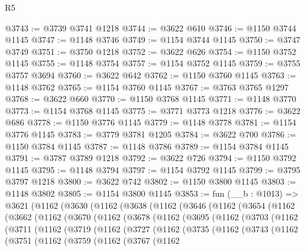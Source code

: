 \begin{lexlean}{R5}
\begin{coremodule}
@3743 := @3739 @3741 @1218
@3744 := @3622 @610
@3746 := @1150 @3744 @1145
@3747 := @1148 @3746
@3749 := @1154 @3744 @1145
@3750 := @3747 @3749
@3751 := @3750 @1218
@3752 := @3622 @626
@3754 := @1150 @3752 @1145
@3755 := @1148 @3754
@3757 := @1154 @3752 @1145
@3759 := @3755 @3757 @3694
@3760 := @3622 @642
@3762 := @1150 @3760 @1145
@3763 := @1148 @3762
@3765 := @1154 @3760 @1145
@3767 := @3763 @3765 @1297
@3768 := @3622 @660
@3770 := @1150 @3768 @1145
@3771 := @1148 @3770
@3773 := @1154 @3768 @1145
@3775 := @3771 @3773 @1218
@3776 := @3622 @686
@3778 := @1150 @3776 @1145
@3779 := @1148 @3778
@3781 := @1154 @3776 @1145
@3783 := @3779 @3781 @1205
@3784 := @3622 @700
@3786 := @1150 @3784 @1145
@3787 := @1148 @3786
@3789 := @1154 @3784 @1145
@3791 := @3787 @3789 @1218
@3792 := @3622 @726
@3794 := @1150 @3792 @1145
@3795 := @1148 @3794
@3797 := @1154 @3792 @1145
@3799 := @3795 @3797 @1218
@3800 := @3622 @742
@3802 := @1150 @3800 @1145
@3803 := @1148 @3802
@3805 := @1154 @3800 @1145
@3853 := fun (__b : @1013) =>
  @3621
    (@1162
      (@3630
        (@1162
          (@3638
            (@1162
              (@3646
                (@1162
                  (@3654
                    (@1162
                      (@3662
                        (@1162
                          (@3670
                            (@1162
                              (@3678
                                (@1162
                                  (@3695
                                    (@1162
                                      (@3703
                                        (@1162
                                          (@3711
                                            (@1162
                                              (@3719
                                                (@1162
                                                  (@3727
                                                    (@1162
                                                      (@3735
                                                        (@1162
                                                          (@3743
                                                            (@1162
                                                              (@3751
                                                                (@1162
                                                                  (@3759
                                                                    (@1162
                                                                      (@3767
                                                                        (@1162

\end{coremodule}
\end{lexlean}
